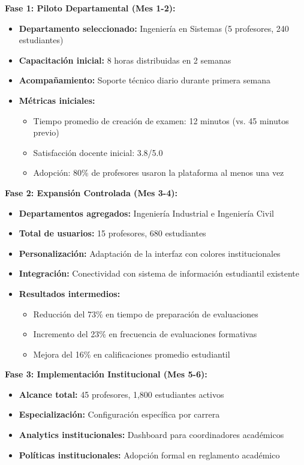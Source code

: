 \documentclass[12pt,a4paper]{report}
\begin{document}
\textbf{Fase 1: Piloto Departamental (Mes 1-2):}
\begin{itemize}
\item \textbf{Departamento seleccionado:} Ingeniería en Sistemas (5 profesores, 240 estudiantes)
\item \textbf{Capacitación inicial:} 8 horas distribuidas en 2 semanas
\item \textbf{Acompañamiento:} Soporte técnico diario durante primera semana
\item \textbf{Métricas iniciales:} 
  \begin{itemize}
  \item Tiempo promedio de creación de examen: 12 minutos (vs. 45 minutos previo)
  \item Satisfacción docente inicial: 3.8/5.0
  \item Adopción: 80\% de profesores usaron la plataforma al menos una vez
  \end{itemize}
\end{itemize}

\textbf{Fase 2: Expansión Controlada (Mes 3-4):}
\begin{itemize}
\item \textbf{Departamentos agregados:} Ingeniería Industrial e Ingeniería Civil
\item \textbf{Total de usuarios:} 15 profesores, 680 estudiantes
\item \textbf{Personalización:} Adaptación de la interfaz con colores institucionales
\item \textbf{Integración:} Conectividad con sistema de información estudiantil existente
\item \textbf{Resultados intermedios:}
  \begin{itemize}
  \item Reducción del 73\% en tiempo de preparación de evaluaciones
  \item Incremento del 23\% en frecuencia de evaluaciones formativas
  \item Mejora del 16\% en calificaciones promedio estudiantil
  \end{itemize}
\end{itemize}

\textbf{Fase 3: Implementación Institucional (Mes 5-6):}
\begin{itemize}
\item \textbf{Alcance total:} 45 profesores, 1,800 estudiantes activos
\item \textbf{Especialización:} Configuración específica por carrera
\item \textbf{Analytics institucionales:} Dashboard para coordinadores académicos
\item \textbf{Políticas institucionales:} Adopción formal en reglamento académico
\end{itemize}
\end{document}
